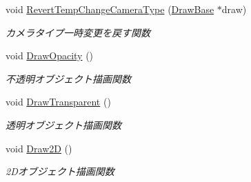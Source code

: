 \begin{DoxyCompactItemize}
void \mbox{\hyperlink{class_render_target_main_aa9e36ecc466757f0d463cf7f638b197a}{Revert\+Temp\+Change\+Camera\+Type}} (\mbox{\hyperlink{class_draw_base}{Draw\+Base}} $\ast$draw)
\begin{DoxyCompactList}\small\item\em カメラタイプ一時変更を戻す関数 \end{DoxyCompactList}\item 
void \mbox{\hyperlink{class_render_target_main_a71adae5f98266115b999d813e44bc393}{Draw\+Opacity}} ()
\begin{DoxyCompactList}\small\item\em 不透明オブジェクト描画関数 \end{DoxyCompactList}\item 
void \mbox{\hyperlink{class_render_target_main_ac6f40e96264e3466e30b86d5e96cf62c}{Draw\+Transparent}} ()
\begin{DoxyCompactList}\small\item\em 透明オブジェクト描画関数 \end{DoxyCompactList}\item 
void \mbox{\hyperlink{class_render_target_main_a5a6629f64c62e8031ccbc44c38c38554}{Draw2D}} ()
\begin{DoxyCompactList}\small\item\em 2\+Dオブジェクト描画関数 \end{DoxyCompactList}\end{DoxyCompactItemize}
